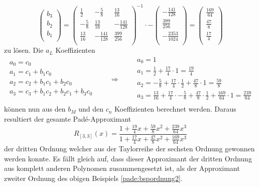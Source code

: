 \[
\renewcommand\arraystretch{1.25}
\begin{pmatrix}
b_{3}\\
b_{2}\\
b_{1}\\
\end{pmatrix}
=
\begin{pmatrix}
\frac{1}{2} & -\frac{5}{8} & \frac{13}{16}\\
-\frac{5}{8} & \frac{13}{16}& -\frac{141}{128}\\
\frac{13}{16} & -\frac{141}{128} & \frac{399}{256} \\
\end{pmatrix}^{-1}
\cdot
-
\begin{pmatrix}
-\frac{141}{128}\\
\frac{399}{256}\\
-\frac{2353}{1024}\\
\end{pmatrix}
=
\begin{pmatrix}
\frac{169}{64}\\
\frac{47}{8}\\
\frac{17}{4}\\
\end{pmatrix}
\]
zu lösen.
Die $a_L$ Koeffizienten 
\begin{equation}
\begin{array}{l}
a_{0}=c_{0} \\
a_{1}=c_{1}+b_{1} c_{0} \\
a_{2}=c_{2}+b_{1} c_{1}+b_{2} c_{0} \\
a_{3}=c_{3}+b_{1} c_{2}+b_{2} c_{1} + b_{3} c_{0} \\
\end{array}
\qquad\Rightarrow\qquad
\begin{array}{l}
a_{0}=1 \\
a_{1}=\frac{1}{2}+\frac{17}{4} \cdot 1 = \frac{19}{4}\\
a_{2}=-\frac{5}{8} +\frac{17}{4}\cdot \frac{1}{2} +\frac{47}{8} \cdot 1 = \frac{59}{8} \\
a_{3}=\frac{13}{16}+\frac{17}{4}\cdot -\frac{5}{8} + \frac{47}{8}\cdot \frac{1}{2} + \frac{169}{64} \cdot 1 = \frac{239}{64}\\
\end{array}
\end{equation}
können nun aus den $b_M$ und den $c_n$ Koeffizienten berechnet werden. 
Daraus resultiert der gesamte Padé-Approximant 
\begin{equation}
R_{[3, 3]}(x)
=
\frac{1+\frac{19}{4}x+\frac{59}{8}x^2+\frac{239}{64}x^3}
{1+\frac{17}{4}x+\frac{47}{8}x^2+\frac{169}{64}x^3}
\end{equation}
der dritten Ordnung welcher aus der Taylorreihe der sechsten Ordnung gewonnen werden konnte.
Es fällt gleich auf, dass dieser Approximant der dritten Ordnung aus komplett anderen Polynomen zusammengesetzt ist, als der Approximant zweiter Ordnung des obigen Beispiels \ref{pade:bspordnung2}.



